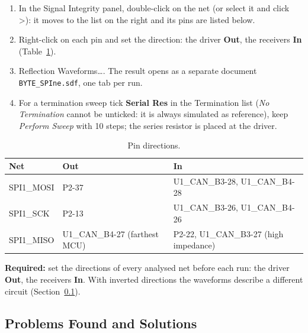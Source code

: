 \documentclass[11pt,a4paper]{article}
\newcommand{\required}[1]{\begin{reqbox}\textbf{\color{reqred}Required:} #1\end{reqbox}}
\newcommand{\gui}[1]{\textsf{#1}}
\begin{document}
\begin{enumerate}
    \item In the Signal Integrity panel, double-click on the net (or select it and click \gui{>}): it moves to
    the list on the right and its pins are listed below.
    \item Right-click on each pin and set the direction: the driver \textbf{Out}, the receivers \textbf{In} (Table~\ref{tab:directions}).
    \item \gui{Reflection Waveforms\dots}. The result opens as a separate document \texttt{BYTE\_SPIne.sdf}, one
    tab per run.
    \item For a termination sweep tick \textbf{Serial Res} in the Termination list (\textit{No Termination} cannot
    be unticked: it is always simulated as reference), keep \textit{Perform Sweep} with 10 steps; the
    series resistor is placed at the driver.
\end{enumerate}

\begin{table}[H]
\centering\small
\begin{tabular}{lll}
\toprule
Net & Out & In \\
\midrule
SPI1\_MOSI & P2-37 & U1\_CAN\_B3-28, U1\_CAN\_B4-28 \\
SPI1\_SCK  & P2-13 & U1\_CAN\_B3-26, U1\_CAN\_B4-26 \\
SPI1\_MISO & U1\_CAN\_B4-27 (farthest MCU) & P2-22, U1\_CAN\_B3-27 (high impedance) \\
\bottomrule
\end{tabular}
\caption{Pin directions.}
\label{tab:directions}
\end{table}

\required{set the directions of every analysed net before each run: the driver \textbf{Out}, the
receivers \textbf{In}. With inverted directions the waveforms describe a different circuit (Section~\ref{sec:problems}).}

\subsection{Problems Found and Solutions}\label{sec:problems}
\end{document}
